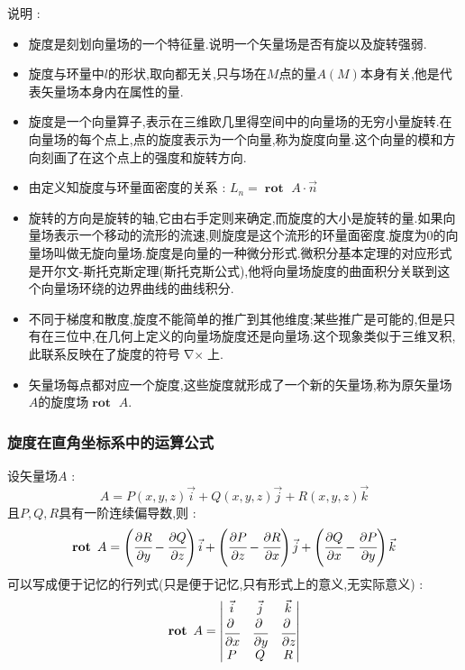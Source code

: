 \documentclass[UTF8,12pt]{ctexbook}
\newcommand{\bigCase}[1]{\left(#1\right)}
\newcommand{\partialDerivativeFrac}[2]{\cfrac{\partial #1}{\partial #2}}
\DeclareMathOperator{\curlSymbol}{\nabla\times}
\DeclareMathOperator{\curlRotText}{\mathbf{rot}\ }
\begin{document}
{{{{{      说明 :
      \begin{itemize}
        \item 旋度是刻划向量场的一个特征量.说明一个矢量场是否有旋以及旋转强弱.
        \item 旋度与环量中$l$的形状,取向都无关,只与场在$M$点的量$A(M)$本身有关,他是代表矢量场本身内在属性的量.
        \item 旋度是一个向量算子,表示在三维欧几里得空间中的向量场的无穷小量旋转.在向量场的每个点上,点的旋度表示为一个向量,称为旋度向量.这个向量的模和方向刻画了在这个点上的强度和旋转方向.
        \item 由定义知旋度与环量面密度的关系 : $L_n = \curlRotText A \cdot \vec{n}$
        \item 旋转的方向是旋转的轴,它由右手定则来确定,而旋度的大小是旋转的量.如果向量场表示一个移动的流形的流速,则旋度是这个流形的环量面密度.旋度为0的向量场叫做无旋向量场.旋度是向量的一种微分形式.微积分基本定理的对应形式是开尔文-斯托克斯定理(斯托克斯公式),他将向量场旋度的曲面积分关联到这个向量场环绕的边界曲线的曲线积分.
        \item 不同于梯度和散度,旋度不能简单的推广到其他维度;某些推广是可能的,但是只有在三位中,在几何上定义的向量场旋度还是向量场.这个现象类似于三维叉积,此联系反映在了旋度的符号$\curlSymbol$上.
        \item 矢量场每点都对应一个旋度,这些旋度就形成了一个新的矢量场,称为原矢量场$A$的旋度场$\curlRotText A$.
      \end{itemize}
    }%

    \subsubsection{旋度在直角坐标系中的运算公式}{
      设矢量场$A$ : $$
        A = P(x,y,z)\vec{i} + Q(x,y,z)\vec{j} + R(x,y,z)\vec{k}
      $$
      且$P,Q,R$具有一阶连续偏导数,则 : $$
        \curlRotText A = \bigCase{\partialDerivativeFrac{R}{y} - \partialDerivativeFrac{Q}{z}}\vec{i} + \bigCase{\partialDerivativeFrac{P}{z} - \partialDerivativeFrac{R}{x}}\vec{j} + \bigCase{\partialDerivativeFrac{Q}{x} - \partialDerivativeFrac{P}{y}}\vec{k}
      $$
      可以写成便于记忆的行列式(只是便于记忆,只有形式上的意义,无实际意义) : $$
        \curlRotText A = \begin{vmatrix}
          \vec{i}                       & \vec{j}                       & \vec{k}                       \\
          \partialDerivativeFrac{\ }{x} & \partialDerivativeFrac{\ }{y} & \partialDerivativeFrac{\ }{z} \\
          P                             & Q                             & R
        \end{vmatrix}
      $$
    }%

}}}}
\end{document}
